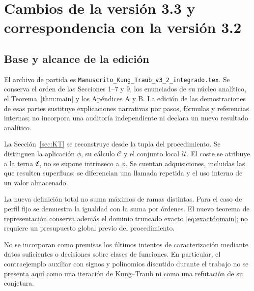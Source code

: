\documentclass[11pt,a4paper]{article}
\numberwithin{equation}{section}
\theoremstyle{definition}
\theoremstyle{remark}
\begin{document}
\par\bigskip
\section{Cambios de la versión 3.3 y correspondencia con la versión 3.2}\label{app:changes}

\subsection{Base y alcance de la edición}
El archivo de partida es \texttt{Manuscrito\_Kung\_Traub\_v3\_2\_integrado.tex}. Se conserva el orden de las Secciones 1--7 y 9, los enunciados de su núcleo analítico, el Teorema~\ref{thm:main} y los Apéndices A y B. La edición de las demostraciones de esas partes sustituye explicaciones narrativas por pasos, fórmulas y referencias internas; no incorpora una auditoría independiente ni declara un nuevo resultado analítico.

La Sección~\ref{sec:KT} se reconstruye desde la tupla del procedimiento. Se distinguen la aplicación $\phi$, su cálculo $\mathscr C$ y el conjunto local $\mathcal U$. El coste se atribuye a la terna $\mathfrak C$, no se supone intrínseco a $\phi$. Se cuentan adquisiciones, incluidas las que resulten superfluas; se diferencian una llamada repetida y el uso interno de un valor almacenado.

La nueva definición total no suma máximos de ramas distintas. Para el caso de perfil fijo se demuestra la igualdad con la suma por órdenes. El nuevo teorema de representación conserva además el dominio truncado exacto \eqref{eq:exactdomain}; no requiere un presupuesto global previo del procedimiento.

No se incorporan como premisas los últimos intentos de caracterización mediante datos suficientes o decisiones sobre clases de funciones. En particular, el contraejemplo auxiliar con signos y polinomios discutido durante el trabajo no se presenta aquí como una iteración de Kung--Traub ni como una refutación de su conjetura.
\end{document}
